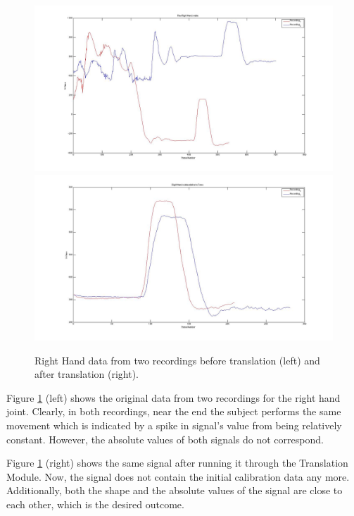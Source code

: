 \documentclass[11pt,a4paper]{article}
\begin{document}
\begin{figure}[H]
\centering
\includegraphics[scale=0.16]{Non_Translated_R_H_Data.jpg}
\includegraphics[scale=0.16]{R_H_Data_Relative_Torso.jpg}

\caption{Right Hand data from two recordings before translation (left) and after translation (right).}
\label{pre_translation_graph}
\end{figure}

\noindent
Figure \ref{pre_translation_graph} (left) shows the original data from two recordings for the right hand joint. Clearly, in both recordings, near the end the subject performs the same movement which is indicated by a spike in signal's value from being relatively constant. However, the absolute values of both signals do not correspond.
 
\noindent
Figure \ref{pre_translation_graph} (right) shows the same signal after running it through the Translation Module. Now, the signal does not contain the initial calibration data any more. Additionally, both the shape and the absolute values of the signal are close to each other, which is the desired outcome.
\end{document}

